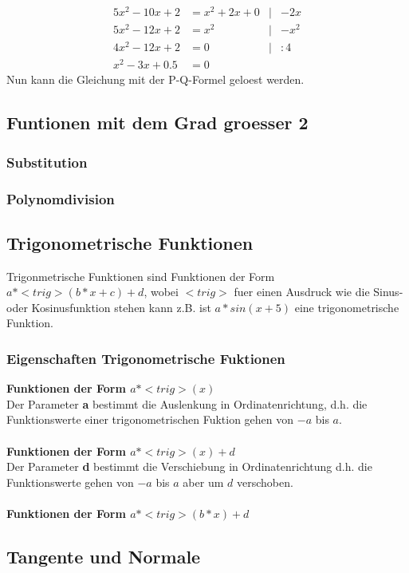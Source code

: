\documentclass[a4paper]{article} %
\begin{document}
		\begin{align*}
			5x^2-10x+2 &= x^2+2x+0 & 	|&-2x\\
			5x^2-12x+2 &= x^2 & 		|&-x^2\\
			4x^2-12x+2 &= 0   & 		|&:4\\
			x^2-3x+0.5 &= 0 	
		\end{align*}
			Nun kann die Gleichung mit der P-Q-Formel geloest werden.
		\newpage
		\subsection{Funtionen mit dem Grad groesser 2}
		\subsubsection{Substitution}
		\subsubsection{Polynomdivision}
		\subsection{Trigonometrische Funktionen}
		Trigonmetrische Funktionen sind Funktionen der Form $a*<trig>(b*x+c)+d$, wobei $<trig>$ fuer einen Ausdruck wie die Sinus- oder Kosinusfunktion stehen kann z.B. ist $a*sin(x+5)$ eine trigonometrische Funktion.
		\subsubsection{Eigenschaften Trigonometrische Fuktionen\\}
		\textbf{Funktionen der Form $a*<trig>(x)$\\}
		Der Parameter \textbf{a} bestimmt die Auslenkung in Ordinatenrichtung, d.h. die Funktionswerte einer trigonometrischen Fuktion gehen von $-a$ bis  $a$.\\\\
		\textbf{Funktionen der Form $a*<trig>(x)+d$\\}
		Der Parameter \textbf{d} bestimmt die Verschiebung in Ordinatenrichtung d.h. die Funktionswerte gehen von $-a$ bis $a$ aber um $d$ verschoben.\\\\
		\textbf{Funktionen der Form $a*<trig>(b*x)+d$\\}

		\subsection{Tangente und Normale}
\end{document}
